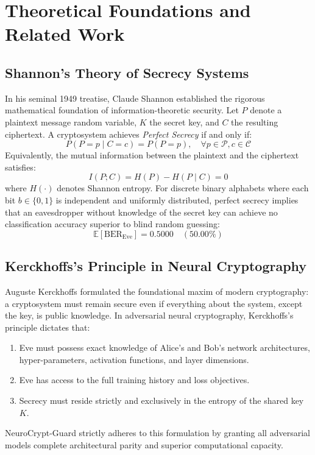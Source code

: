\documentclass[journal,10pt,twocolumn]{IEEEtran}
\begin{document}
\section{Theoretical Foundations and Related Work}

\subsection{Shannon's Theory of Secrecy Systems}
In his seminal 1949 treatise, Claude Shannon \cite{shannon1949communication} established the rigorous mathematical foundation of information-theoretic security. Let $P$ denote a plaintext message random variable, $K$ the secret key, and $C$ the resulting ciphertext. A cryptosystem achieves \textit{Perfect Secrecy} if and only if:
\begin{equation}
    P(P = p \mid C = c) = P(P = p), \quad \forall p \in \mathcal{P}, c \in \mathcal{C}
\end{equation}
Equivalently, the mutual information between the plaintext and the ciphertext satisfies:
\begin{equation}
    I(P; C) = H(P) - H(P \mid C) = 0
\end{equation}
where $H(\cdot)$ denotes Shannon entropy. For discrete binary alphabets where each bit $b \in \{0, 1\}$ is independent and uniformly distributed, perfect secrecy implies that an eavesdropper without knowledge of the secret key can achieve no classification accuracy superior to blind random guessing:
\begin{equation}
    \mathbb{E}[\text{BER}_{\text{Eve}}] = 0.5000 \quad (50.00\%)
\end{equation}

\subsection{Kerckhoffs's Principle in Neural Cryptography}
Auguste Kerckhoffs formulated the foundational maxim of modern cryptography: a cryptosystem must remain secure even if everything about the system, except the key, is public knowledge. In adversarial neural cryptography, Kerckhoffs's principle dictates that:
\begin{enumerate}
    \item Eve must possess exact knowledge of Alice's and Bob's network architectures, hyper-parameters, activation functions, and layer dimensions.
    \item Eve has access to the full training history and loss objectives.
    \item Secrecy must reside strictly and exclusively in the entropy of the shared key $K$.
\end{enumerate}
NeuroCrypt-Guard strictly adheres to this formulation by granting all adversarial models complete architectural parity and superior computational capacity.
\end{document}
